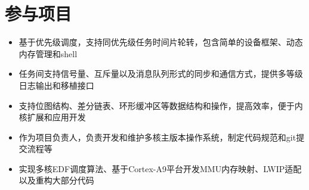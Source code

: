 \documentclass{resume}
\begin{document}


\section{参与项目}
\begin{itemize}
    \item 基于优先级调度，支持同优先级任务时间片轮转，包含简单的设备框架、动态内存管理和shell
    \item 任务间支持信号量、互斥量以及消息队列形式的同步和通信方式，提供多等级日志输出和移植接口
    \item 支持位图结构、差分链表、环形缓冲区等数据结构和操作，提高效率，便于内核扩展和应用开发
\end{itemize}

\begin{itemize}
    \item 作为项目负责人，负责开发和维护多核主版本操作系统，制定代码规范和git提交流程等
    \item 实现多核EDF调度算法、基于Cortex-A9平台开发MMU内存映射、LWIP适配以及重构大部分代码
\end{itemize}
\end{document}
